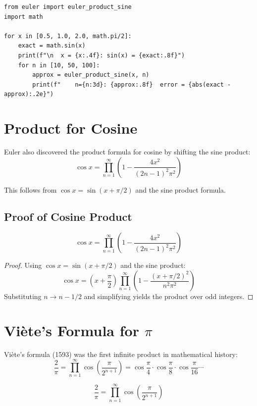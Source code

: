\begin{lstlisting}[caption={Euler's sine product}, label=lst:euler_sine]
from euler import euler_product_sine
import math

for x in [0.5, 1.0, 2.0, math.pi/2]:
    exact = math.sin(x)
    print(f"\n  x = {x:.4f}: sin(x) = {exact:.8f}")
    for n in [10, 50, 100]:
        approx = euler_product_sine(x, n)
        print(f"    n={n:3d}: {approx:.8f}  error = {abs(exact - approx):.2e}")
\end{lstlisting}

\section{Product for Cosine}

Euler also discovered the product formula for cosine by shifting the sine product:
\[
\cos x = \prod_{n=1}^\infty \left(1 - \frac{4x^2}{(2n-1)^2 \pi^2}\right)
\]

This follows from $\cos x = \sin(x + \pi/2)$ and the sine product formula.

\subsection{Proof of Cosine Product}

\begin{theorem}
\[
\cos x = \prod_{n=1}^{\infty} \left(1 - \frac{4x^2}{(2n-1)^2\pi^2}\right)
\]
\end{theorem}

\begin{proof}
Using $\cos x = \sin(x + \pi/2)$ and the sine product:
\[
\cos x = \left(x + \frac{\pi}{2}\right) \prod_{n=1}^{\infty} \left(1 - \frac{(x+\pi/2)^2}{n^2\pi^2}\right)
\]
Substituting $n \to n - 1/2$ and simplifying yields the product over odd integers.
\end{proof}

\section{Vi\`{e}te's Formula for $\pi$}

Vi\`{e}te's formula (1593) was the first infinite product in mathematical history:
\[
\frac{2}{\pi} = \prod_{n=1}^\infty \cos\left(\frac{\pi}{2^{n+1}}\right)
= \cos\frac{\pi}{4} \cdot \cos\frac{\pi}{8} \cdot \cos\frac{\pi}{16} \cdots
\]

\begin{theorem}[Vi\`{e}te's Formula]
\[
\frac{2}{\pi} = \prod_{n=1}^{\infty} \cos\left(\frac{\pi}{2^{n+1}}\right)
\]
\end{theorem}

